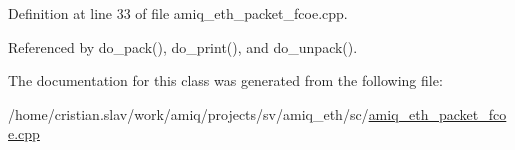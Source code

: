 Definition at line 33 of file amiq\_\-eth\_\-packet\_\-fcoe.cpp.

Referenced by do\_\-pack(), do\_\-print(), and do\_\-unpack().

The documentation for this class was generated from the following file:\begin{DoxyCompactItemize}
\item 
/home/cristian.slav/work/amiq/projects/sv/amiq\_\-eth/sc/\hyperlink{amiq__eth__packet__fcoe_8cpp}{amiq\_\-eth\_\-packet\_\-fcoe.cpp}\end{DoxyCompactItemize}

